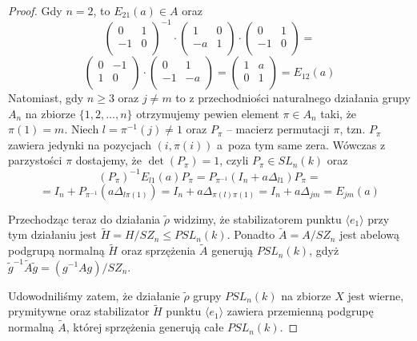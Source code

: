 \documentclass[licencjacka]{pracamgr}
\begin{document}
\begin{proof}
  Gdy $n = 2$, to $E_{2 1}(a) \in A$ oraz 
  $$ 
    \left( \begin{array}{cc} 0 & 1 \\ -1 & 0 \\ \end{array} \right)^{-1} \cdot
    \left( \begin{array}{cc} 1 & 0 \\ -a & 1 \\ \end{array} \right) \cdot
    \left( \begin{array}{cc} 0 & 1 \\ -1 & 0 \\ \end{array} \right) = 
  $$
  $$ 
    \left( \begin{array}{cc} 0 & -1 \\ 1 & 0 \\ \end{array} \right) \cdot
    \left( \begin{array}{cc} 0 & 1 \\ -1 & -a \\ \end{array} \right) =
    \left( \begin{array}{cc} 1 & a \\ 0 & 1 \\ \end{array} \right) = E_{1 2}(a)
  $$
  Natomiast, gdy $n \ge 3$ oraz $j \ne m$ to z przechodniości naturalnego działania grupy $A_n$ na zbiorze $\{1, 2, \ldots, n \}$ 
  otrzymujemy pewien element $\pi \in A_n$ taki, że $\pi(1) = m$. Niech $l = \pi^{-1}(j) \ne 1$ oraz $P_\pi$ -- macierz permutacji $\pi$,
  tzn. $P_\pi$ zawiera jedynki na pozycjach $(i, \pi(i))$ a~poza tym same zera.
  Wówczas z parzystości $\pi$ dostajemy, że $\det(P_\pi) = 1$, czyli $P_\pi \in SL_n(k)$ oraz
  $$ (P_\pi)^{-1} E_{l 1}(a) P_\pi = P_{\pi^{-1}} (I_n + a \Delta_{l 1}) P_\pi = $$
  $$ = I_n + P_{\pi^{-1}} (a \Delta_{l \pi(1)}) = I_n + a \Delta_{\pi(l) \pi(1)} = I_n + a \Delta_{j m} = E_{j m}(a) $$
  
  Przechodząc teraz do działania $\tilde{\rho}$ widzimy, że stabilizatorem punktu $\langle e_1 \rangle$ 
  przy tym działaniu jest $\tilde{H} = H/SZ_n \le PSL_n(k)$.
  Ponadto $\tilde{A} = A/SZ_n$ jest abelową podgrupą normalną $\tilde{H}$ oraz sprzężenia $\tilde{A}$ generują $PSL_n(k)$,
  gdyż $\tilde{g}^{-1} \tilde{A} \tilde{g} = (g^{-1} A g) / SZ_n$.

  Udowodniliśmy zatem, że działanie $\tilde{\rho}$ grupy $PSL_n(k)$ na zbiorze $X$ jest wierne, prymitywne 
  oraz stabilizator $\tilde{H}$ punktu $\langle e_1 \rangle$ zawiera przemienną podgrupę normalną $\tilde{A}$, 
  której sprzężenia generują całe $PSL_n(k)$.


\end{proof}
\end{document}
